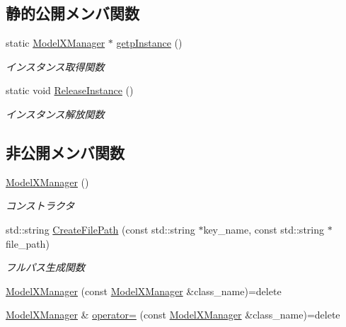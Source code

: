 \subsection*{静的公開メンバ関数}
\begin{DoxyCompactItemize}
\item 
static \mbox{\hyperlink{class_model_x_manager}{Model\+X\+Manager}} $\ast$ \mbox{\hyperlink{class_model_x_manager_a141baa9d96bf528ffced9a884b3b5828}{getp\+Instance}} ()
\begin{DoxyCompactList}\small\item\em インスタンス取得関数 \end{DoxyCompactList}\item 
static void \mbox{\hyperlink{class_model_x_manager_aa53b75de4f147652a5abb61c66eaa4bd}{Release\+Instance}} ()
\begin{DoxyCompactList}\small\item\em インスタンス解放関数 \end{DoxyCompactList}\end{DoxyCompactItemize}
\subsection*{非公開メンバ関数}
\begin{DoxyCompactItemize}
\item 
\mbox{\hyperlink{class_model_x_manager_aa9add853f72deb575e332f39c3373624}{Model\+X\+Manager}} ()
\begin{DoxyCompactList}\small\item\em コンストラクタ \end{DoxyCompactList}\item 
std\+::string \mbox{\hyperlink{class_model_x_manager_a7c152c72ec36cb12a6ae2007f84c6405}{Create\+File\+Path}} (const std\+::string $\ast$key\+\_\+name, const std\+::string $\ast$file\+\_\+path)
\begin{DoxyCompactList}\small\item\em フルパス生成関数 \end{DoxyCompactList}\item 
\mbox{\hyperlink{class_model_x_manager_a6df03f9aef72a490b755955e70f12685}{Model\+X\+Manager}} (const \mbox{\hyperlink{class_model_x_manager}{Model\+X\+Manager}} \&class\+\_\+name)=delete
\item 
\mbox{\hyperlink{class_model_x_manager}{Model\+X\+Manager}} \& \mbox{\hyperlink{class_model_x_manager_adc65f6b4b9b06b4a20923245606175d8}{operator=}} (const \mbox{\hyperlink{class_model_x_manager}{Model\+X\+Manager}} \&class\+\_\+name)=delete
\end{DoxyCompactItemize}

